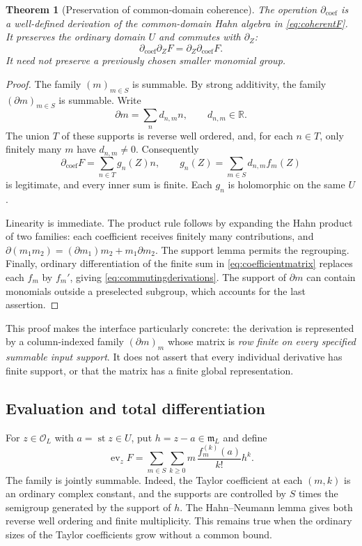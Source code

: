 \documentclass[11pt]{article}
\numberwithin{equation}{section}
\newtheorem{theorem}{Theorem}[section]
\theoremstyle{definition}
\newcommand{\R}{\mathbb R}
\newcommand{\OO}{\mathcal O}
\newcommand{\mm}{\mathfrak m}
\newcommand{\DD}{\partial}
\newcommand{\Dc}{\partial_{\mathrm{coef}}}
\newcommand{\Dz}{\partial_Z}
\newcommand{\st}{\operatorname{st}}
\newcommand{\ev}{\operatorname{ev}}
\begin{document}
\begin{theorem}[Preservation of common-domain coherence]
\label{thm:coefficientderivation}
The operation $\Dc$ is a well-defined derivation of the common-domain
Hahn algebra in \eqref{eq:coherentF}. It preserves the ordinary domain
$U$ and commutes with $\Dz$:
\begin{equation}\label{eq:commutingderivations}
 \Dc\Dz F=\Dz\Dc F.
\end{equation}
It need not preserve a previously chosen smaller monomial group.
\end{theorem}
\begin{proof}
The family $(m)_{m\in S}$ is summable. By strong additivity, the family
$(\DD m)_{m\in S}$ is summable. Write
\[
 \DD m=\sum_n d_{n,m}n,\qquad d_{n,m}\in\R.
\]
The union $T$ of these supports is reverse well ordered, and, for each
$n\in T$, only finitely many $m$ have $d_{n,m}\ne0$. Consequently
\begin{equation}\label{eq:coefficientmatrix}
 \Dc F=\sum_{n\in T}g_n(Z)n,
 \qquad g_n(Z)=\sum_{m\in S}d_{n,m}f_m(Z)
\end{equation}
is legitimate, and every inner sum is finite. Each $g_n$ is holomorphic
on the same $U$.

Linearity is immediate. The product rule follows by expanding the Hahn
product of two families: each coefficient receives finitely many
contributions, and $\DD(m_1m_2)=(\DD m_1)m_2+m_1\DD m_2$.
The support lemma permits the regrouping. Finally, ordinary differentiation
of the finite sum in \eqref{eq:coefficientmatrix} replaces each $f_m$ by
$f_m'$, giving \eqref{eq:commutingderivations}. The support of $\DD m$
can contain monomials outside a preselected subgroup, which accounts for
the last assertion.
\end{proof}

This proof makes the interface particularly concrete: the derivation is
represented by a column-indexed family $(\DD m)_m$ whose matrix is
\emph{row finite on every specified summable input support}. It does not
assert that every individual derivative has finite support, or that the
matrix has a finite global representation.

\subsection{Evaluation and total differentiation}
For $z\in\OO_L$ with $a=\st z\in U$, put $h=z-a\in\mm_L$ and
define
\begin{equation}\label{eq:evaluation}
 \ev_z F=
 \sum_{m\in S}\sum_{k\ge0}
     m\,\frac{f_m^{(k)}(a)}{k!}h^k.
\end{equation}
The family is jointly summable. Indeed, the Taylor coefficient at each
$(m,k)$ is an ordinary complex constant, and the supports are controlled
by $S$ times the semigroup generated by the support of $h$. The
Hahn--Neumann lemma gives both reverse well ordering and finite
multiplicity. This remains true when the ordinary sizes of the Taylor
coefficients grow without a common bound.
\end{document}
